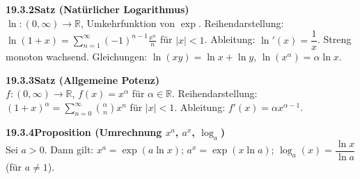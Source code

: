 \documentclass[a4paper,12pt]{article}
\newcommand{\gentry}[3]{%
  \noindent\textbf{#1\quad #2}\nopagebreak\\[0.2em]
  #3\par\smallskip
}
\begin{document}
\gentry{19.3.2}{Satz (Natürlicher Logarithmus)}{%
  $\ln:(0,\infty)\to\mathbb{R}$, Umkehrfunktion von $\exp$.
  Reihendarstellung: $\ln(1+x) = \sum_{n=1}^{\infty}(-1)^{n-1}\frac{x^n}{n}$ für $|x|<1$.
  Ableitung: $\ln'(x) = \dfrac{1}{x}$. Streng monoton wachsend.
  Gleichungen: $\ln(xy)=\ln x+\ln y$, $\ln(x^\alpha)=\alpha\ln x$.
}

\gentry{19.3.3}{Satz (Allgemeine Potenz)}{%
  $f:(0,\infty)\to\mathbb{R}$, $f(x)=x^\alpha$ für $\alpha\in\mathbb{R}$.
  Reihendarstellung: $(1+x)^\alpha = \sum_{n=0}^{\infty}\binom{\alpha}{n}x^n$ für $|x|<1$.
  Ableitung: $f'(x) = \alpha x^{\alpha-1}$.
}

\gentry{19.3.4}{Proposition (Umrechnung $x^a$, $a^x$, $\log_a$)}{%
  Sei $a > 0$. Dann gilt:
  $x^a = \exp(a\ln x)$; \quad
  $a^x = \exp(x\ln a)$; \quad
  $\log_a(x) = \dfrac{\ln x}{\ln a}$ (für $a \ne 1$).
}
\end{document}

